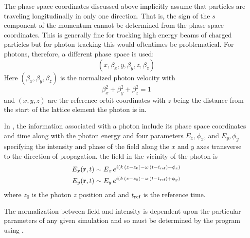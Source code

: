 The phase space coordinates discussed above implicitly assume that
particles are traveling longitudinally in only one direction. That is,
the sign of the $s$ component of the momentum cannot be determined
from the phase space coordinates. This is generally fine for tracking
high energy beams of charged particles but for photon tracking this
would oftentimes be problematical. For photons, therefore, a different
phase space is used:
\begin{equation}
  (x, \beta_x, y, \beta_y, z, \beta_z)
  \label{xbybzb}
\end{equation}
Here $(\beta_x, \beta_y, \beta_z)$ is the normalized photon velocity with
\begin{equation}
  \beta_x^2 + \beta_y^2 + \beta_z^2 = 1 
  \label{bbb1}
\end{equation}
and $(x, y, z)$ are the reference orbit coordinates with $z$ being the
distance from the start of the lattice element the photon is in.

In \bmad, the information associated with a photon include its phase
space coordinates and time along with the photon energy and four
parameters $E_x, \phi_x$, and $E_y, \phi_y$ specifying the intensity
and phase of the field along the $x$ and $y$ axes transverse to the
direction of propagation.  the field in the vicinity of the photon is
\begin{align}
  E_x ({\bf r}, t) &\sim E_x \, e^{i (k \, (z - z_0) - \omega \, (t - t_{\text{ref}}) + \phi_x)} \nonumber \\
  E_y ({\bf r}, t) &\sim E_y \, e^{i (k \, (z - z_0) - \omega \, (t - t_{\text{ref}}) + \phi_y)} 
  \label{ertee}
\end{align}
where $z_0$ is the photon $z$ position and and $t_{\text{ref}}$ is the reference time.

The normalization between field and intensity is dependent upon the
particular parameters of any given simulation and so must be
determined by the program using \bmad.

